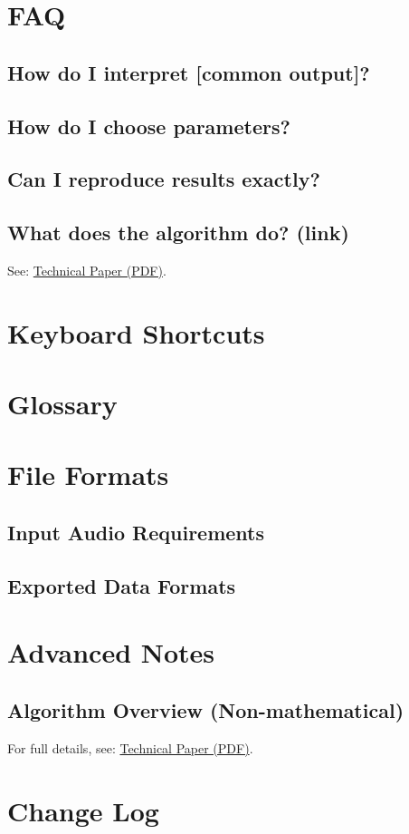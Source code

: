 \documentclass[11pt]{report}
\begin{document}
    \chapter{FAQ}
    \section{How do I interpret [common output]?}
    \section{How do I choose parameters?}
    \section{Can I reproduce results exactly?}
    \section{What does the algorithm do? (link)}
    See:
    \href{run:TechnicalPaper.pdf}{Technical Paper (PDF)}.
    
    \chapter{Keyboard Shortcuts}
    
    \chapter{Glossary}
    
    \appendix
    \chapter{File Formats}
    \section{Input Audio Requirements}
    \section{Exported Data Formats}
    
    \chapter{Advanced Notes}
    \section{Algorithm Overview (Non-mathematical)}
    For full details, see:
    \href{run:TechnicalPaper.pdf}{Technical Paper (PDF)}.
    
    \chapter{Change Log}
    
\end{document}
